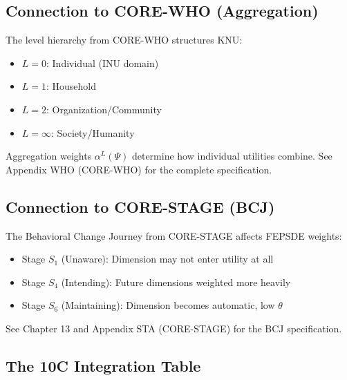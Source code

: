 \subsection{Connection to CORE-WHO (Aggregation)}
\label{sec:fepsde-levels}

\begin{cross-reference}
The level hierarchy from CORE-WHO structures KNU:
\begin{itemize}[nosep]
  \item $L=0$: Individual (INU domain)
  \item $L=1$: Household
  \item $L=2$: Organization/Community
  \item $L=\infty$: Society/Humanity
\end{itemize}
Aggregation weights $\alpha^L(\Psi)$ determine how individual utilities combine.
See Appendix WHO (CORE-WHO) for the complete specification.
\end{cross-reference}

\subsection{Connection to CORE-STAGE (BCJ)}
\label{sec:fepsde-bcj}

\begin{cross-reference}
The Behavioral Change Journey from CORE-STAGE affects FEPSDE weights:
\begin{itemize}[nosep]
  \item Stage $S_1$ (Unaware): Dimension may not enter utility at all
  \item Stage $S_4$ (Intending): Future dimensions weighted more heavily
  \item Stage $S_6$ (Maintaining): Dimension becomes automatic, low $\theta$
\end{itemize}
See Chapter 13 and Appendix STA (CORE-STAGE) for the BCJ specification.
\end{cross-reference}

\subsection{The 10C Integration Table}

